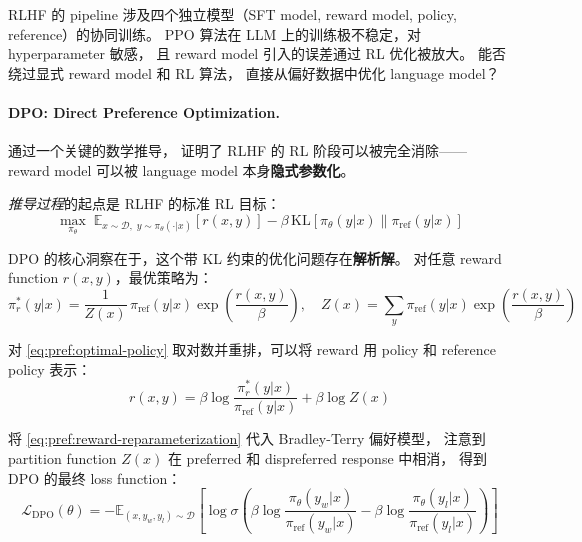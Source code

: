 \begin{problembox}
RLHF 的 pipeline 涉及四个独立模型（SFT model, reward model, policy, reference）的协同训练。
PPO 算法在 LLM 上的训练极不稳定，对 hyperparameter 敏感，
且 reward model 引入的误差通过 RL 优化被放大。
能否绕过显式 reward model 和 RL 算法，
直接从偏好数据中优化 language model？
\end{problembox}

\paragraph{DPO: Direct Preference Optimization.}
 通过一个关键的数学推导，
证明了 RLHF 的 RL 阶段可以被完全消除——
reward model 可以被 language model 本身\textbf{隐式参数化}。

\textit{推导过程}的起点是 RLHF 的标准 RL 目标：
\begin{equation}
\label{eq:pref:rl-obj}
\max_{\pi_\theta}\; \mathbb{E}_{x \sim \mathcal{D},\; y \sim \pi_\theta(\cdot|x)} \left[
  r(x, y)
\right] - \beta\, \text{KL}\!\left[\pi_\theta(y|x) \| \pi_{\text{ref}}(y|x)\right]
\end{equation}

DPO 的核心洞察在于，这个带 KL 约束的优化问题存在\textbf{解析解}。
对任意 reward function $r(x, y)$，最优策略为：
\begin{equation}
\label{eq:pref:optimal-policy}
\pi_r^*(y|x) = \frac{1}{Z(x)}\, \pi_{\text{ref}}(y|x) \exp\!\left(\frac{r(x, y)}{\beta}\right),
\quad Z(x) = \sum_y \pi_{\text{ref}}(y|x) \exp\!\left(\frac{r(x, y)}{\beta}\right)
\end{equation}

对 \cref{eq:pref:optimal-policy} 取对数并重排，可以将 reward 用 policy 和 reference policy 表示：
\begin{equation}
\label{eq:pref:reward-reparameterization}
r(x, y) = \beta \log \frac{\pi_r^*(y|x)}{\pi_{\text{ref}}(y|x)} + \beta \log Z(x)
\end{equation}

将 \cref{eq:pref:reward-reparameterization} 代入 Bradley-Terry 偏好模型，
注意到 partition function $Z(x)$ 在 preferred 和 dispreferred response 中相消，
得到 DPO 的最终 loss function：
\begin{equation}
\label{eq:pref:dpo-loss}
\boxed{
\mathcal{L}_{\text{DPO}}(\theta) = -\mathbb{E}_{(x, y_w, y_l) \sim \mathcal{D}} \left[
  \log \sigma\!\left(
    \beta \log \frac{\pi_\theta(y_w|x)}{\pi_{\text{ref}}(y_w|x)}
    - \beta \log \frac{\pi_\theta(y_l|x)}{\pi_{\text{ref}}(y_l|x)}
  \right)
\right]
}
\end{equation}

